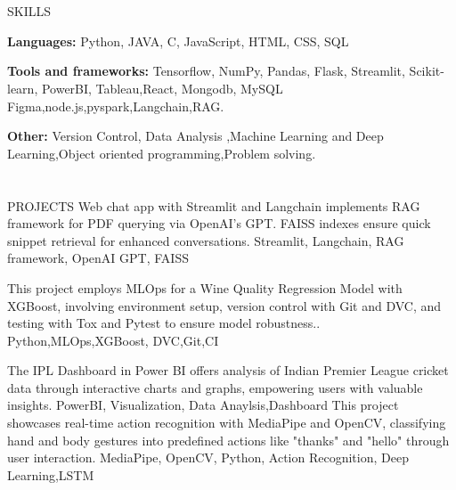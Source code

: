 \documentclass{my_cv}
\begin{document}
\begin{multicols}{2}
\section{\faList}{SKILLS}

\textbf{Languages:}  Python, JAVA, C, JavaScript, HTML, CSS, SQL

\noindent\textbf{Tools and frameworks:} Tensorflow, NumPy, Pandas, Flask, Streamlit, Scikit-learn, PowerBI, Tableau,React, Mongodb, MySQL Figma,node.js,pyspark,Langchain,RAG.

\noindent\textbf{Other:}  Version Control, Data Analysis ,Machine Learning and Deep Learning,Object oriented programming,Problem solving.

\section{\faPaintBrush}{PROJECTS}
%
    {}%
    {Web chat app with Streamlit and Langchain implements RAG framework for PDF querying via OpenAI's GPT. FAISS indexes ensure quick snippet retrieval for enhanced conversations.}%
    {Streamlit, Langchain, RAG framework, OpenAI GPT, FAISS }%
    

%
    {}%
    {This project employs MLOps for a Wine Quality Regression Model with XGBoost, involving environment setup, version control with Git and DVC, and testing with Tox and Pytest to ensure model robustness..}%
    {Python,MLOps,XGBoost, DVC,Git,CI}
     
%
    {}%
    {The IPL Dashboard in Power BI offers analysis of Indian Premier League cricket data through interactive charts and graphs, empowering users with valuable insights.}%
    {PowerBI, Visualization, Data Anaylsis,Dashboard}
%
    {}%
    {This project showcases real-time action recognition with MediaPipe and OpenCV, classifying hand and body gestures into predefined actions like "thanks" and "hello" through user interaction. }
    {MediaPipe, OpenCV, Python, Action Recognition, Deep Learning,LSTM}
    

\columnbreak





\end{multicols}
\end{document}

